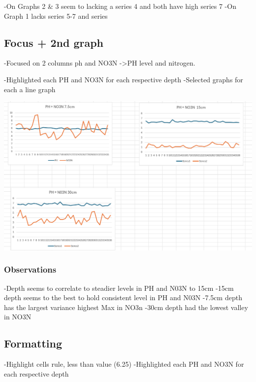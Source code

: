 \documentclass[
  letterpaper,
  DIV=11,
  numbers=noendperiod]{scrreprt}
\begin{document}
-On Graphs 2 \& 3 seem to lacking a series 4 and both have high series 7
-On Graph 1 lacks series 5-7 and series

\subsection{Focus + 2nd graph}\label{focus-2nd-graph}

-Focused on 2 columns ph and NO3N -\textgreater PH level and nitrogen.

-Highlighted each PH and NO3N for each respective depth -Selected graphs
for each a line graph

\includegraphics{./Excel_1_Unit/Week1_Diego/Week_1DJ/screenshots/Soil4.png}

\subsubsection{Observations}\label{observations-4}

-Depth seems to correlate to steadier levels in PH and N03N to 15cm
-15cm depth seems to the best to hold consistent level in PH and N03N
-7.5cm depth has the largest variance highest Max in NO3n -30cm depth
had the lowest valley in NO3N

\subsection{Formatting}\label{formatting}

-Highlight cells rule, less than value (6.25) -Highlighted each PH and
NO3N for each respective depth
\end{document}
